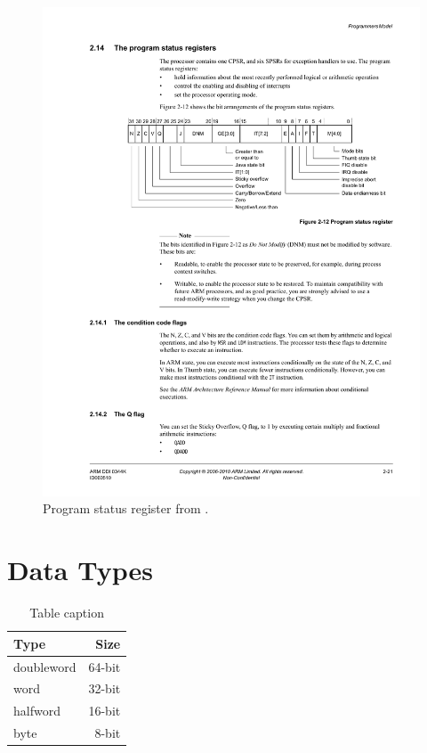 \documentclass[oneside,a4paper]{article}
\begin{document}
\begin{figure}[h]
	\centering
	\includegraphics{./fig/CPSR.pdf}
	\caption{Program status register from \cite[p. 2-21]{A8Ref}.}
	\label{fig:cpsr}
\end{figure}


\section{Data Types}

\begin{table}[htbp]
	\centering
	\begin{tabular}{lr}
		\toprule
		Type			&		Size		\\
		\midrule
		doubleword		&		64-bit		\\
		word			& 		32-bit		\\
		halfword 		& 		16-bit		\\
		byte 			& 		8-bit		\\
		\bottomrule
	\end{tabular}
	\caption{Table caption}
	\label{tab:typesizes}
\end{table}
\end{document}
